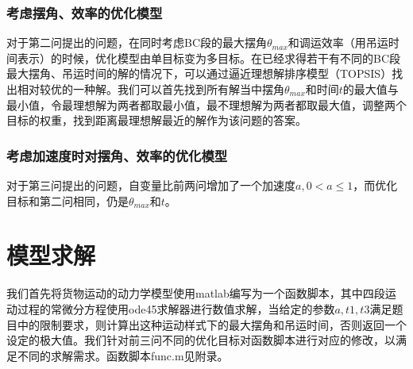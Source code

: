 \documentclass[withoutpreface,bwprint]{cumcmthesis} %
\begin{document}
\subsubsection{考虑摆角、效率的优化模型}
对于第二问提出的问题，在同时考虑BC段的最大摆角$\theta_{max}$和调运效率（用吊运时间表示）的时候，优化模型由单目标变为多目标。在已经求得若干有不同的BC段最大摆角、吊运时间的解的情况下，可以通过逼近理想解排序模型（TOPSIS）找出相对较优的一种解。我们可以首先找到所有解当中摆角$\theta_{max}$和时间$t$的最大值与最小值，令最理想解为两者都取最小值，最不理想解为两者都取最大值，调整两个目标的权重，找到距离最理想解最近的解作为该问题的答案。

\subsubsection{考虑加速度时对摆角、效率的优化模型}
对于第三问提出的问题，自变量比前两问增加了一个加速度$a, 0<a\leq1$，而优化目标和第二问相同，仍是$\theta_{max}$和$t$。

\section{模型求解}
我们首先将货物运动的动力学模型使用matlab编写为一个函数脚本，其中四段运动过程的常微分方程使用ode45求解器进行数值求解，当给定的参数$a,t1,t3$满足题目中的限制要求，则计算出这种运动样式下的最大摆角和吊运时间，否则返回一个设定的极大值。我们针对前三问不同的优化目标对函数脚本进行对应的修改，以满足不同的求解需求。函数脚本func.m见附录。
\end{document}
